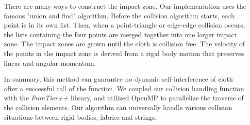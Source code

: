 There are many ways to construct the impact zone. Our implementation uses the famous "union and find" algorithm. Before the collision algorithm starts, each point is in its own list. Then, when a point-triangle or edge-edge collision occurs, the lists containing the four points are merged together into one larger impact zone. The impact zones are grown until the cloth is collision free. The velocity of the points in the impact zone is derived from a rigid body motion that preserves linear and angular momentum.

In summary, this method can guarantee no dynamic self-interference of cloth after a successful call of the function. We coupled our collision handling function with the {\it
FronTier++} library, and utilized OpenMP to parallelize the traverse of the collision elements. Our algorithm can universally handle various collision situations between rigid bodies, fabrics and strings.

